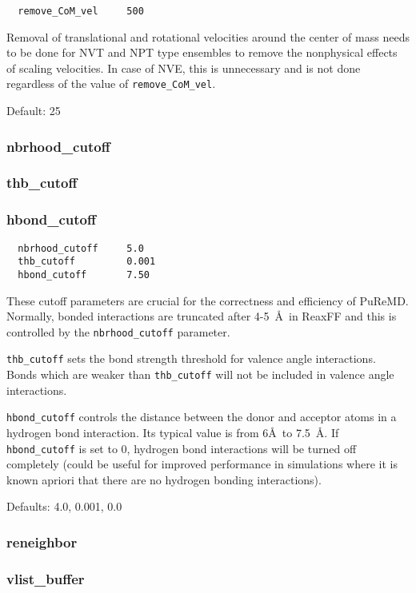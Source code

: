 \documentclass{article}
\begin{document}
\begin{verbatim}
  remove_CoM_vel     500
\end{verbatim}
Removal of translational and rotational velocities around the center of 
mass needs to be done for NVT and NPT type ensembles to remove the 
nonphysical effects of scaling velocities. In case of NVE, this is  
unnecessary and is not done regardless of the value of {\tt remove\_CoM\_vel}.

Default: 25

\subsubsection{nbrhood\_cutoff}
\label{sec:nbrhood_cutoff}
\subsubsection{thb\_cutoff}
\label{sec:thb_cutoff}
\subsubsection{hbond\_cutoff}
\label{sec:hbond_cutoff}

\begin{verbatim}
  nbrhood_cutoff     5.0     
  thb_cutoff         0.001   
  hbond_cutoff       7.50
\end{verbatim}
These cutoff parameters are crucial for the correctness and efficiency
of PuReMD. Normally, bonded interactions are truncated after 4-5~\AA\ in 
ReaxFF and this is controlled by the {\tt nbrhood\_cutoff} parameter.

{\tt thb\_cutoff} sets the bond strength threshold for valence angle 
interactions. Bonds which are weaker than {\tt thb\_cutoff} will not 
be included in valence angle interactions.

{\tt hbond\_cutoff} controls the distance between the donor and acceptor 
atoms in a hydrogen bond interaction. Its typical value is from 6\AA\ to 
7.5~\AA. If {\tt hbond\_cutoff} is set to 0, hydrogen bond interactions 
will be turned off completely (could be useful for improved
performance in simulations where it is known apriori that there are no 
hydrogen bonding interactions).

Defaults: 4.0, 0.001, 0.0

\subsubsection{reneighbor}
\label{sec:reneighbor}
\subsubsection{vlist\_buffer}
\label{sec:vlist_buffer}
\end{document}
